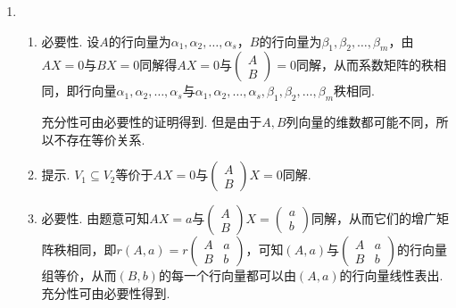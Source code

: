 \begin{enumerate}
    \item \begin{enumerate}
              \item 必要性. 设$A$的行向量为$\alpha_1,\alpha_2,\ldots,\alpha_s$，$B$的行向量为$\beta_1,\beta_2,\ldots,\beta_m$，由$AX=0$与$BX=0$同解得$AX=0$与$\begin{pmatrix}A \\ B\end{pmatrix}=0$同解，从而系数矩阵的秩相同，即行向量$\alpha_1,\alpha_2,\ldots,\alpha_s$与$\alpha_1,\alpha_2,\ldots,\alpha_s,\beta_1,\beta_2,\ldots,\beta_m$秩相同. %

                    充分性可由必要性的证明得到. 但是由于$A,B$列向量的维数都可能不同，所以不存在等价关系.

              \item 提示. $V_1\subseteq V_2$等价于$AX=0$与$\begin{pmatrix}
                            A \\
                            B
                        \end{pmatrix}X=0$同解.

              \item 必要性. 由题意可知$AX=a$与$\begin{pmatrix} A \\ B \end{pmatrix}X=\begin{pmatrix} a \\ b \end{pmatrix}$同解，从而它们的增广矩阵秩相同，即$r(A,a)=r\begin{pmatrix}
                            A & a \\
                            B & b
                        \end{pmatrix}$，可知$(A,a)$与$\begin{pmatrix}
                            A & a \\
                            B & b
                        \end{pmatrix}$的行向量组等价，从而$(B,b)$的每一个行向量都可以由$(A,a)$的行向量线性表出.\\
                    充分性可由必要性得到.


\end{enumerate}
\end{enumerate}
